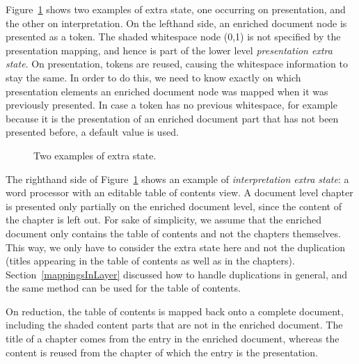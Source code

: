 Figure~\ref{layerExtraState} shows two examples of extra state, one occurring on presentation, and the other on interpretation. On the lefthand side, an enriched document node is presented as a token. The shaded whitespace node (0,1) is not specified by the presentation mapping, and hence is part of the lower level {\em presentation extra state}. On presentation, tokens are reused, causing the whitespace information to stay the same. In order to do this, we need to know exactly on which presentation elements an enriched document node was mapped when it was previously presented. In case a token has no previous whitespace, for example because it is the presentation of an enriched document part that has not been presented before, a default value is used.

\begin{figure}
\begin{center}
\begin{center}
\end{center}
\caption{Two examples of extra state.} \label{layerExtraState} 
\end{center}
\end{figure}


The righthand side of Figure~\ref{layerExtraState} shows an example of {\em interpretation extra state}: a word processor with an editable table of contents view. A document level chapter is presented only partially on the enriched document level, since the content of the chapter is left out. For sake of simplicity, we assume that the enriched document only contains the table of contents and not the chapters themselves. This way, we only have to consider the extra state here and not the duplication (titles appearing in the table of contents as well as in the chapters). Section~\ref{mappingsInLayer} discussed how to handle duplications in general, and the same method can be used for the table of contents.

On reduction, the table of contents is mapped back onto a complete document, including the shaded content parts that are not in the enriched document. The title of a chapter comes from the entry in the enriched document, whereas the content is reused from the chapter of which the entry is the presentation. 



